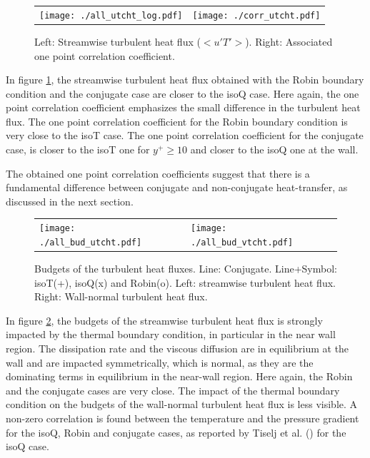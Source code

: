\documentclass[review]{elsarticle}
\begin{document}
\begin{figure}[htbp]
\begin{tabular}[htbp]{ll}
\texttt{[image: ./all\_utcht\_log.pdf]} &
\texttt{[image: ./corr\_utcht.pdf]}
\end{tabular}
\caption{Left: Streamwise turbulent heat flux ($<u'T'>$). Right: Associated one point correlation coefficient.}
\label{all_ut}
\end{figure}

In figure \ref{all_ut}, the streamwise turbulent heat flux obtained with the Robin boundary condition and the conjugate case are closer to the isoQ case. Here again, the one point correlation coefficient emphasizes the small difference in the turbulent heat flux. The one point correlation coefficient for the Robin boundary condition is very close to the isoT case. The one point correlation coefficient for the conjugate case, is closer to the isoT one for $y^+ \geq 10$ and closer to the isoQ one at the wall.

The obtained one point correlation coefficients suggest that there is a fundamental difference between conjugate and non-conjugate heat-transfer, as discussed in the next section.

\begin{figure}[htbp]
\begin{tabular}[htbp]{ll}
\texttt{[image: ./all\_bud\_utcht.pdf]} & 
\texttt{[image: ./all\_bud\_vtcht.pdf]}
\end{tabular}
\caption{Budgets of the turbulent heat fluxes. Line: Conjugate. Line+Symbol: isoT(+), isoQ(x) and Robin(o). Left: streamwise turbulent heat flux. Right: Wall-normal turbulent heat flux.}
\label{all_bud_ut_vt}
\end{figure}

In figure \ref{all_bud_ut_vt}, the budgets of the streamwise turbulent heat flux is strongly impacted by the thermal boundary condition, in particular in the near wall region. The dissipation rate and the viscous diffusion are in equilibrium at the wall and are impacted symmetrically, which is normal, as they are the dominating terms in equilibrium in the near-wall region. Here again, the Robin and the conjugate cases are very close.
The impact of the thermal boundary condition on the budgets of the wall-normal turbulent heat flux is less visible. A non-zero correlation is found between the temperature and the pressure gradient for the isoQ, Robin and conjugate cases, as reported by Tiselj et al. (\cite{Tiselj2001dns}) for the isoQ case.
\end{document}
